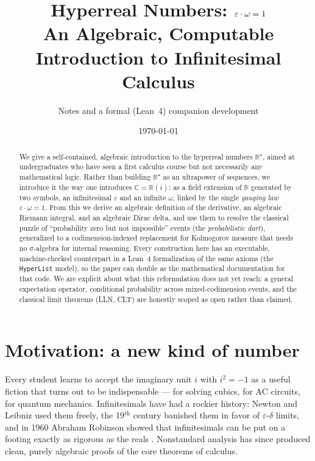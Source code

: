 \documentclass[11pt]{article}
\title{Hyperreal Numbers: $\eps \cdot \omega = 1$\\
\large An Algebraic, Computable Introduction to Infinitesimal Calculus}
\author{Notes and a formal (Lean~4) companion development}
\date{\today}
\theoremstyle{definition}
\theoremstyle{remark}
\newcommand{\R}{\mathbb{R}}
\newcommand{\Rstar}{\mathbb{R}^{\star}}
\newcommand{\eps}{\varepsilon}
\begin{document}
\maketitle

\begin{abstract}
We give a self-contained, algebraic introduction to the hyperreal numbers
$\Rstar$, aimed at undergraduates who have seen a first calculus course but
not necessarily any mathematical logic. Rather than building $\Rstar$ as an
ultrapower of sequences, we introduce it the way one introduces $\mathbb C
= \R(i)$: as a field extension of $\R$ generated by two symbols, an
infinitesimal $\eps$ and an infinite $\omega$, linked by the single
\emph{gauging law} $\eps\cdot\omega = 1$. From this we derive an algebraic
definition of the derivative, an algebraic Riemann integral, and an
algebraic Dirac delta, and use them to resolve the classical puzzle of
``probability zero but not impossible'' events (the \emph{probabilistic
dart}), generalized to a codimension-indexed replacement for Kolmogorov
measure that needs no $\sigma$-algebra for internal reasoning. Every
construction here has an executable, machine-checked counterpart in a
Lean~4 formalization of the same axioms (the \texttt{HyperList} model), so
the paper can double as the mathematical documentation for that code. We
are explicit about what this reformulation does not yet reach: a general
expectation operator, conditional probability across mixed-codimension
events, and the classical limit theorems (LLN, CLT) are honestly scoped as
open rather than claimed.
\end{abstract}

\tableofcontents

\section{Motivation: a new kind of number}

Every student learns to accept the imaginary unit $i$ with $i^2=-1$ as a
useful fiction that turns out to be indispensable — for solving cubics,
for AC circuits, for quantum mechanics. Infinitesimals have had a rockier
history: Newton and Leibniz used them freely, the 19$^{\text{th}}$ century
banished them in favor of $\eps$-$\delta$ limits, and in 1960 Abraham
Robinson showed that infinitesimals can be put on a footing exactly as
rigorous as the reals \cite{robinson}. Nonstandard analysis has since
produced clean, purely algebraic proofs of the core theorems of calculus.
\end{document}
